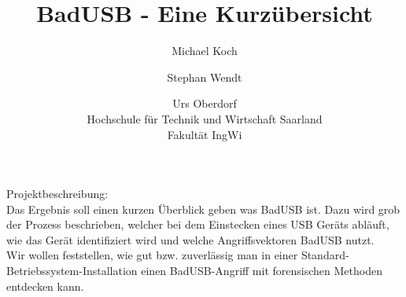 \documentclass[ a4paper, 12pt, ]{article}
\title{BadUSB - Eine Kurzübersicht}
\author{Michael Koch \and{Stephan Wendt} \and{Urs Oberdorf}\\Hochschule für Technik und Wirtschaft Saarland\\Fakultät IngWi}
\date{} %
\begin{document}
\maketitle
Projektbeschreibung:\\
Das Ergebnis soll einen kurzen Überblick geben was BadUSB ist. Dazu wird grob der Prozess beschrieben,
welcher bei dem Einstecken eines USB Geräts abläuft, wie das Gerät identifiziert wird und welche 
Angriffsvektoren BadUSB nutzt.\\
Wir wollen feststellen, wie gut bzw. zuverlässig man in einer
Standard-Betriebssystem-Installation einen BadUSB-Angriff mit forensischen
Methoden entdecken kann.
\end{document}
